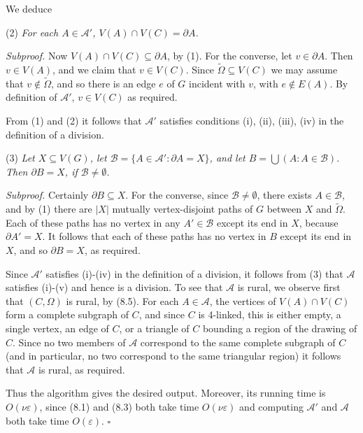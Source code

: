 We deduce

\hspace*{12pt}(2) \textit{For each $A \in \mathcal{A}'$, $V(A) \cap V(C) = \partial A$.}

\textit{Subproof.} Now $V(A) \cap V(C) \subseteq \partial A$, by (1). For the converse, let $v \in \partial A$. Then $v \in V(A)$, and we claim that $v \in V(C)$. Since $\tilde{\Omega} \subseteq V(C)$ we may assume that $v \notin \tilde{\Omega}$, and so there is an edge $e$ of $G$ incident with $v$, with $e \notin E(A)$. By definition of $\mathcal{A}'$, $v \in V(C)$ as required.

From (1) and (2) it follows that $\mathcal{A}'$ satisfies conditions (i), (ii), (iii), (iv) in the definition of a division.

\hspace*{12pt}(3) \textit{Let $X \subseteq V(G)$, let $\mathcal{B} = \{A \in \mathcal{A}' : \partial A = X\}$, and let $B = \bigcup(A : A \in \mathcal{B})$. Then $\partial B = X$, if $\mathcal{B} \ne \emptyset$.}

\textit{Subproof.} Certainly $\partial B \subseteq X$. For the converse, since $\mathcal{B} \ne \emptyset$, there exists $A \in \mathcal{B}$, and by (1) there are $|X|$ mutually vertex-disjoint paths of $G$ between $X$ and $\tilde{\Omega}$. Each of these paths has no vertex in any $A' \in \mathcal{B}$ except its end in $X$, because $\partial A' = X$. It follows that each of these paths has no vertex in $B$ except its end in $X$, and so $\partial B = X$, as required.

Since $\mathcal{A}'$ satisfies (i)-(iv) in the definition of a division, it follows from (3) that $\mathcal{A}$ satisfies (i)-(v) and hence is a division. To see that $\mathcal{A}$ is rural, we observe first that $(C, \Omega)$ is rural, by (8.5). For each $A \in \mathcal{A}$, the vertices of $V(A) \cap V(C)$ form a complete subgraph of $C$, and since $C$ is 4-linked, this is either empty, a single vertex, an edge of $C$, or a triangle of $C$ bounding a region of the drawing of $C$. Since no two members of $\mathcal{A}$ correspond to the same complete subgraph of $C$ (and in particular, no two correspond to the same triangular region) it follows that $\mathcal{A}$ is rural, as required.

Thus the algorithm gives the desired output. Moreover, its running time is $O(\nu\varepsilon)$, since (8.1) and (8.3) both take time $O(\nu\varepsilon)$ and computing $\mathcal{A}'$ and $\mathcal{A}$ both take time $O(\varepsilon)$. $\square$

